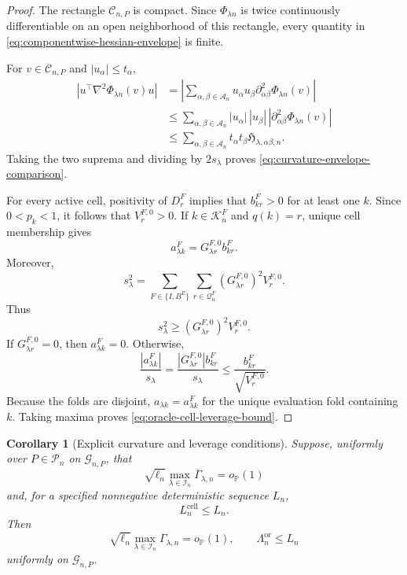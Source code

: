 \documentclass[11pt]{article}
\newtheorem{corollary}[theorem]{Corollary}
\theoremstyle{definition}
\newcommand{\1}{\mathbf 1}\newcommand{\op}{\operatorname}
\begin{document}
\begin{proof}
The rectangle $\mathcal C_{n,P}$ is compact. Since
$\Phi_{\lambda n}$ is twice continuously differentiable on an open
neighborhood of this rectangle, every quantity in
\eqref{eq:componentwise-hessian-envelope} is finite.

For $v\in\mathcal C_{n,P}$ and $|u_\alpha|\le t_\alpha$,
\[
\begin{split}
\left|
u^\top\nabla^2\Phi_{\lambda n}(v)u
\right|
&=
\left|
\sum_{\alpha,\beta\in\mathcal A_n}
u_\alpha u_\beta
\partial_{\alpha\beta}^2\Phi_{\lambda n}(v)
\right|\\
&\le
\sum_{\alpha,\beta\in\mathcal A_n}
|u_\alpha|\,|u_\beta|\,
\left|
\partial_{\alpha\beta}^2\Phi_{\lambda n}(v)
\right|\\
&\le
\sum_{\alpha,\beta\in\mathcal A_n}
t_\alpha t_\beta
\mathfrak H_{\lambda,\alpha\beta,n}.
\end{split}
\]
Taking the two suprema and dividing by $2s_\lambda$ proves
\eqref{eq:curvature-envelope-comparison}.

For every active cell, positivity of $D_r^F$ implies that
$b_{kr}^F>0$ for at least one $k$. Since $0<p_k<1$, it follows that
$V_r^{F,0}>0$. If $k\in\mathcal K_n^F$ and $q(k)=r$, unique cell
membership gives
\[
a_{\lambda k}^F
=
G_{\lambda r}^{F,0}b_{kr}^F.
\]
Moreover,
\begin{equation}
s_\lambda^2
=
\sum_{F\in\{I,B^E\}}
\sum_{r\in\mathcal Q_n^F}
(G_{\lambda r}^{F,0})^2V_r^{F,0}.
\label{eq:cellwise-oracle-variance}
\end{equation}
Thus
\[
s_\lambda^2
\ge
(G_{\lambda r}^{F,0})^2V_r^{F,0}.
\]
If $G_{\lambda r}^{F,0}=0$, then $a_{\lambda k}^F=0$. Otherwise,
\[
\frac{|a_{\lambda k}^F|}{s_\lambda}
=
\frac{|G_{\lambda r}^{F,0}|b_{kr}^F}{s_\lambda}
\le
\frac{b_{kr}^F}{\sqrt{V_r^{F,0}}}.
\]
Because the folds are disjoint, $a_{\lambda k}=a_{\lambda k}^F$
for the unique evaluation fold containing $k$. Taking maxima proves
\eqref{eq:oracle-cell-leverage-bound}.
\end{proof}

\begin{corollary}[Explicit curvature and leverage conditions]
\label{cor:explicit-curvature-leverage}
Suppose, uniformly over $P\in\mathcal P_n$ on
$\mathcal G_{n,P}$, that
\begin{equation}
\sqrt{\ell_n}
\max_{\lambda\in\mathcal I_n}
\overline\Gamma_{\lambda,n}
=
o_{\mathbb P}(1)
\label{eq:explicit-curvature-rate}
\end{equation}
and, for a specified nonnegative deterministic sequence $L_n$,
\begin{equation}
L_n^{\mathrm{cell}}\le L_n.
\label{eq:explicit-cell-leverage-rate}
\end{equation}
Then
\[
\sqrt{\ell_n}
\max_{\lambda\in\mathcal I_n}
\Gamma_{\lambda,n}
=
o_{\mathbb P}(1),
\qquad
\Lambda_n^{\mathrm{or}}\le L_n
\]
uniformly on $\mathcal G_{n,P}$.
\end{corollary}
\end{document}
